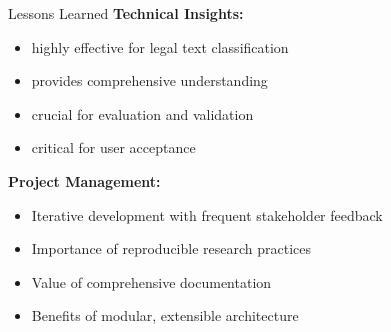 \begin{frame}{Lessons Learned}
\textbf{Technical Insights:}
\begin{itemize}
    \item {} highly effective for legal text classification
    \item {} provides comprehensive understanding
    \item {} crucial for evaluation and validation
    \item {} critical for user acceptance
\end{itemize}

\vspace{0.5cm}
\textbf{Project Management:}
\begin{itemize}
    \item Iterative development with frequent stakeholder feedback
    \item Importance of reproducible research practices
    \item Value of comprehensive documentation
    \item Benefits of modular, extensible architecture
\end{itemize}
\end{frame}
